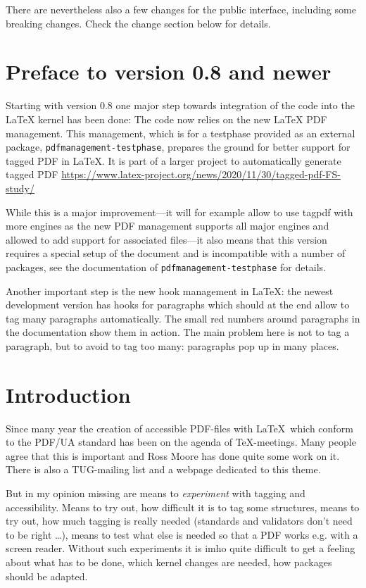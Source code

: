 \documentclass[DIV=12,parskip=half-,bibliography=totoc]{scrartcl}
\newcommand\PDF{PDF}
\begin{document}
There are nevertheless also a few changes for the public interface, including some breaking changes. Check the change section below for
details.



\section{Preface to version 0.8 and newer}

Starting with version 0.8 one major step towards integration of the code into the \LaTeX{} kernel has been done:
The code now relies on the new \LaTeX{} PDF management. This management, which is for a testphase provided
as an external package, \texttt{pdfmanagement-testphase},
prepares the ground for better support for tagged PDF in \LaTeX{}.
It is part of a larger project to automatically generate tagged PDF \url{https://www.latex-project.org/news/2020/11/30/tagged-pdf-FS-study/}

While this is a major improvement---it will for example allow to use tagpdf with more engines as the new PDF management supports all major engines and allowed to add support for associated files---it also means that this version requires a special setup of the document and is incompatible with a number of packages,
see the documentation of \texttt{pdfmanagement-testphase} for details.

Another important step is the new hook management in \LaTeX: the newest development version has hooks for paragraphs which should at the end allow to tag many paragraphs automatically. The small red numbers around paragraphs in the documentation show them in action. The main problem here is not to tag a paragraph, but to avoid to tag too many: paragraphs pop up in many places.

\section{Introduction}

Since many year the creation of accessible \PDF{}-files with \LaTeX\ which conform to the PDF/UA standard has been on the agenda of \TeX-meetings. Many people agree that this is important and Ross Moore has done quite some work on it. There is also a TUG-mailing list and a webpage \parencite{tugaccess} dedicated to this theme.

But in my opinion missing are means to \emph{experiment} with tagging and accessibility. Means to try out, how difficult it is to tag some structures, means to try out, how much tagging is really needed (standards and validators don't need to be right \ldots), means to test what else is needed so that a \PDF{} works e.g. with a screen reader. Without such experiments it is imho quite difficult to get a feeling about what has to be done, which kernel changes are needed, how packages should be adapted.
\end{document}
